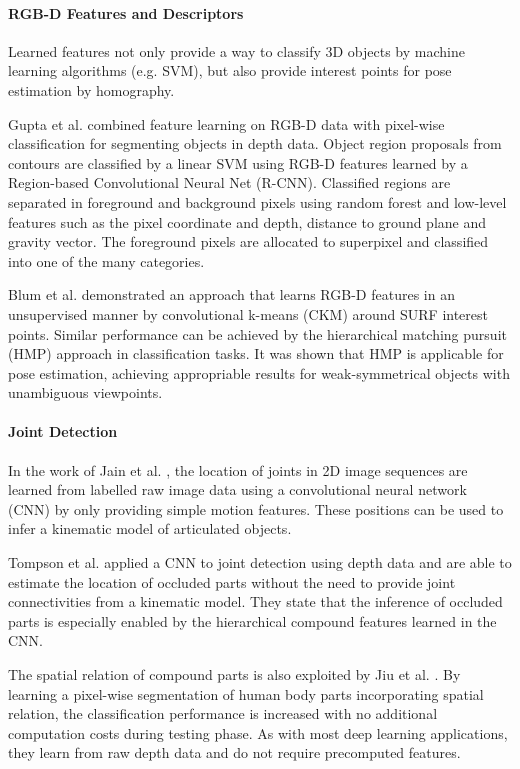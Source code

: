 \paragraph{RGB-D Features and Descriptors}
Learned features not only provide a way to classify 3D objects by machine learning algorithms (e.g. SVM), but also provide interest points for pose estimation by homography.

Gupta et al. \cite{Gupta2014} combined feature learning on RGB-D data with pixel-wise classification for segmenting objects in depth data. Object region proposals from contours are classified by a linear SVM using RGB-D features learned by a Region-based Convolutional Neural Net (R-CNN). Classified regions are separated in foreground and background pixels using random forest and low-level features such as the pixel coordinate and depth, distance to ground plane and gravity vector. The foreground pixels are allocated to superpixel and classified into one of the many categories.

Blum et al. \cite{Blum2012} demonstrated an approach that learns RGB-D features in an unsupervised manner by convolutional k-means (CKM) around SURF interest points. Similar performance can be achieved by the hierarchical matching pursuit (HMP) approach \cite{Bo2013} in classification tasks. It was shown that HMP is applicable for pose estimation, achieving appropriable results for weak-symmetrical objects with unambiguous viewpoints.

\paragraph{Joint Detection}
In the work of Jain et al. \cite{Jain2015}, the location of joints in 2D image sequences are learned from labelled raw image data using a convolutional neural network (CNN) by only providing simple motion features. These positions can be used to infer a kinematic model of articulated objects.

Tompson et al. \cite{Tompson2014} applied a CNN to joint detection using depth data and are able to estimate the location of occluded parts without the need to provide joint connectivities from a kinematic model. They state that the inference of occluded parts is especially enabled by the hierarchical compound features learned in the CNN.

The spatial relation of compound parts is also exploited by Jiu et al. \cite{Jiu2014}. By learning a pixel-wise segmentation of human body parts incorporating spatial relation, the classification performance is increased with no additional computation costs during testing phase. As with most deep learning applications, they learn from raw depth data and do not require precomputed features.



